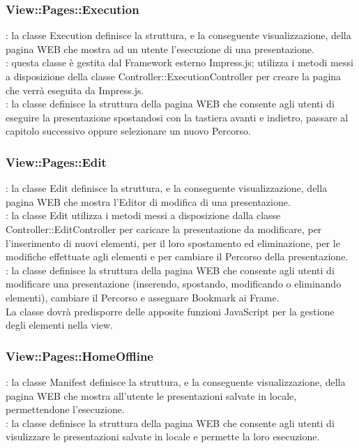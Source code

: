 {{		\subsubsection{View::\-Pages::\-Execution}{
			\textbf{\tipo}: la classe Execution definisce la struttura, e la conseguente visualizzazione, della pagina WEB che mostra ad un utente l'esecuzione di una presentazione.\\
			\textbf{\relaz}: questa classe è gestita dal Framework esterno Impress.js; utilizza i metodi messi a disposizione della classe Controller::\-ExecutionController per creare la pagina che verrà eseguita da Impress.js.\\
			\textbf{\attivita}: la classe definisce la struttura della pagina WEB che consente agli utenti di eseguire la presentazione spostandosi con la tastiera avanti e indietro, passare al capitolo successivo oppure selezionare un nuovo Percorso.
		}
		\subsubsection{View::\-Pages::\-Edit}{
			\textbf{\tipo}: la classe Edit definisce la struttura, e la conseguente visualizzazione, della pagina WEB che mostra l'Editor di modifica di una presentazione.\\
			\textbf{\relaz}: la classe Edit utilizza i metodi messi a disposizione dalla classe Controller::\-EditController per caricare la presentazione da modificare, per l'inserimento di nuovi elementi, per il loro spostamento ed eliminazione, per le modifiche  effettuate agli elementi e per cambiare il Percorso della presentazione.\\
			\textbf{\attivita}: la classe definisce la struttura della pagina WEB che consente agli utenti di modificare una presentazione (inserendo, spostando, modificando o eliminando elementi), cambiare il Percorso e assegnare Bookmark\ped{g} ai Frame.\\
			La classe dovrà predisporre delle apposite funzioni JavaScript per la gestione degli elementi nella view.
		}

		
		\subsubsection{View::\-Pages::\-HomeOffline}{
			\textbf{\tipo}: la classe Manifest definisce la struttura, e la conseguente visualizzazione, della pagina WEB che mostra all'utente le presentazioni salvate in locale, permettendone l'esecuzione.\\
			\textbf{\attivita}: la classe definisce la struttura della pagina WEB che consente agli utenti di visulizzare le presentazioni salvate in locale e permette la loro esecuzione.\\
		}
}}
